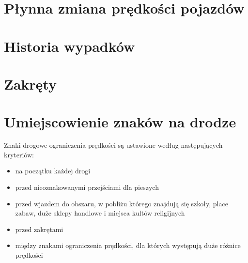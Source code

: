 \newpage
\section{Płynna zmiana prędkości pojazdów}
\label{sec:zakręty}

\newpage
\section{Historia wypadków}
\label{sec:zakręty}

\newpage
\section{Zakręty}
\label{sec:zakręty}

\section{Umiejscowienie znaków na drodze}
\label{sec:speedLimitLocalization}
Znaki drogowe ograniczenia prędkości są ustawione według następujących kryteriów:
\begin{itemize}
\item na początku każdej drogi
\item przed nieoznakowanymi przejściami dla pieszych
\item przed wjazdem do obszaru, w pobliżu którego znajdują się szkoły, place zabaw, duże sklepy handlowe i miejsca kultów religijnych
\item przed zakrętami
\item między znakami ograniczenia prędkości, dla których występują duże różnice prędkości
\end{itemize}

